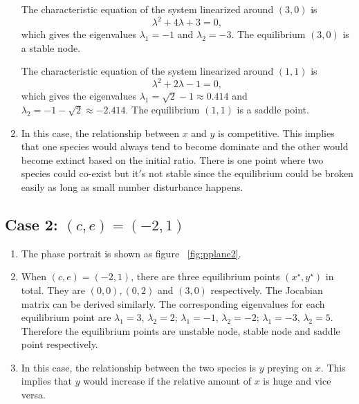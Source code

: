 \begin{enumerate}
The characteristic equation of the system linearized around $(3,0)$ is
$$\lambda^2 +4 \lambda + 3 = 0,$$ which gives the eigenvalues $\lambda_1 = -1$ and $\lambda_2 = -3$. The equilibrium $(3,0)$ is a stable node.

The characteristic equation of the system linearized around $(1,1)$ is $$\lambda^2 +2 \lambda - 1 = 0,$$ which gives the eigenvalues $\lambda_1 = \sqrt{2} -1 \approx 0.414$ and $\lambda_2 = -1 -\sqrt{2} \approx -2.414$. The equilibrium $(1,1)$ is a saddle point.

\item In this case, the relationship between $x$ and $y$ is competitive. This implies that one species would always tend to become dominate and the other would become extinct based on the initial ratio. There is one point where two species could co-exist but it$'$s not stable since the equilibrium could be broken easily as long as small number disturbance happens.  
\end{enumerate}

\subsection*{Case 2: $(c,e)=(-2,1)$}
\begin{enumerate}
\item The phase portrait is shown as figure ~\ref{fig:pplane2}.
\item When $(c,e)=(-2,1)$, there are three equilibrium points $(x^\star,y^\star)$ in total. They are $(0,0),(0,2)$ and $(3,0)$ respectively. The Jocabian matrix can be derived similarly. The corresponding eigenvalues for each equilibrium point are $\lambda_{1} = 3$, $\lambda_{2} = 2$; $\lambda_1 = -1$, $\lambda_2 = -2$; $\lambda_1 = -3$, $\lambda_2 = 5$. Therefore the equilibrium points are unstable node, stable node and saddle point respectively.
\item In this case, the relationship between the two species is $y$ preying on $x$. This implies that $y$ would increase if the relative amount of $x$ is huge and vice versa.
\end{enumerate}

